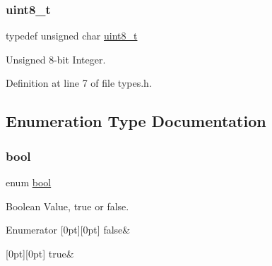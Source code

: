 \subsubsection{\texorpdfstring{uint8\+\_\+t}{uint8\_t}}
{\footnotesize\ttfamily typedef unsigned char \hyperlink{a00035_aba7bc1797add20fe3efdf37ced1182c5_aba7bc1797add20fe3efdf37ced1182c5}{uint8\+\_\+t}}



Unsigned 8-\/bit Integer. 



Definition at line 7 of file types.\+h.



\subsection{Enumeration Type Documentation}
\mbox{\label{a00035_af6a258d8f3ee5206d682d799316314b1_af6a258d8f3ee5206d682d799316314b1}} 
\subsubsection{\texorpdfstring{bool}{bool}}
{\footnotesize\ttfamily enum \hyperlink{a00035_af6a258d8f3ee5206d682d799316314b1_af6a258d8f3ee5206d682d799316314b1}{bool}}



Boolean Value, true or false. 

\begin{DoxyEnumFields}{Enumerator}
[0pt][0pt]{}\mbox{\label{a00035_af6a258d8f3ee5206d682d799316314b1_af6a258d8f3ee5206d682d799316314b1ae9de385ef6fe9bf3360d1038396b884c}} 
false&\\
\hline

[0pt][0pt]{}\mbox{\label{a00035_af6a258d8f3ee5206d682d799316314b1_af6a258d8f3ee5206d682d799316314b1a08f175a5505a10b9ed657defeb050e4b}} 
true&\\
\hline

\end{DoxyEnumFields}


